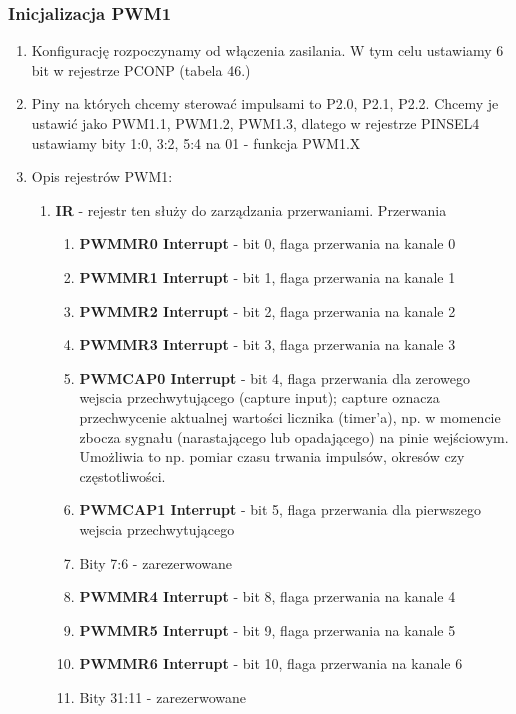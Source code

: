 \subsubsection{Inicjalizacja PWM1}
\begin{enumerate}
    \item Konfigurację rozpoczynamy od włączenia zasilania. W tym celu ustawiamy 6 bit w rejestrze PCONP (tabela 46.) %
    \item Piny na których chcemy sterować impulsami to P2.0, P2.1, P2.2. Chcemy je ustawić jako PWM1.1, PWM1.2, PWM1.3, dlatego w rejestrze PINSEL4 ustawiamy bity 1:0, 3:2, 5:4 na 01 - funkcja PWM1.X
    \item Opis rejestrów PWM1:\\
    \begin{enumerate}
        \item \textbf{IR} - rejestr ten służy do zarządzania przerwaniami. Przerwania 
        \begin{enumerate}
            \item \textbf{PWMMR0 Interrupt} - bit 0, flaga przerwania na kanale 0
            \item \textbf{PWMMR1 Interrupt} - bit 1, flaga przerwania na kanale 1
            \item \textbf{PWMMR2 Interrupt} - bit 2, flaga przerwania na kanale 2
            \item \textbf{PWMMR3 Interrupt} - bit 3, flaga przerwania na kanale 3
            \item \textbf{PWMCAP0 Interrupt} - bit 4, flaga przerwania dla zerowego wejscia przechwytującego (capture input); capture oznacza przechwycenie aktualnej wartości licznika (timer'a), np. w momencie zbocza sygnału (narastającego lub opadającego) na pinie wejściowym. Umożliwia to np. pomiar czasu trwania impulsów, okresów czy częstotliwości.
            \item \textbf{PWMCAP1 Interrupt} - bit 5, flaga przerwania dla pierwszego wejscia przechwytującego 
            \item Bity 7:6 - zarezerwowane
            \item \textbf{PWMMR4 Interrupt} - bit 8, flaga przerwania na kanale 4
            \item \textbf{PWMMR5 Interrupt} - bit 9, flaga przerwania na kanale 5
            \item \textbf{PWMMR6 Interrupt} - bit 10, flaga przerwania na kanale 6
            \item Bity 31:11 - zarezerwowane


\end{enumerate}
\end{enumerate}
\end{enumerate}
